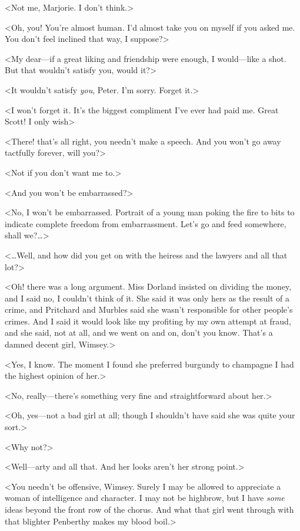 <Not me, Marjorie. I don't think.>

<Oh, you! You're almost human. I'd almost take you on myself if you asked me. You don't feel inclined that way, I suppose?>

<My dear—if a great liking and friendship were enough, I would—like a shot. But that wouldn't satisfy you, would it?>

<It wouldn't satisfy \emph{you}, Peter. I'm sorry. Forget it.>

<I won't forget it. It's the biggest compliment I've ever had paid me. Great Scott! I only wish\longdots>

<There! that's all right, you needn't make a speech. And you won't go away tactfully forever, will you?>

<Not if you don't want me to.>

<And you won't be embarrassed?>

<No, I won't be embarrassed. Portrait of a young man poking the fire to bits to indicate complete freedom from embarrassment. Let's go and feed somewhere, shall we?\dots>

<\dots Well, and how did you get on with the heiress and the lawyers and all that lot?>

<Oh! there was a long argument. Miss Dorland insisted on dividing the money, and I said no, I couldn't think of it. She said it was only hers as the result of a crime, and Pritchard and Murbles said she wasn't responsible for other people's crimes. And I said it would look like my profiting by my own attempt at fraud, and she said, not at all, and we went on and on, don't you know. That's a damned decent girl, Wimsey.>

<Yes, I know. The moment I found she preferred burgundy to champagne I had the highest opinion of her.>

<No, really—there's something very fine and straightforward about her.>

<Oh, yes—not a bad girl at all; though I shouldn't have said she was quite your sort.>

<Why not?>

<Well—arty and all that. And her looks aren't her strong point.>

<You needn't be offensive, Wimsey. Surely I may be allowed to appreciate a woman of intelligence and character. I may not be highbrow, but I have \emph{some} ideas beyond the front row of the chorus. And what that girl went through with that blighter Penberthy makes my blood boil.>

